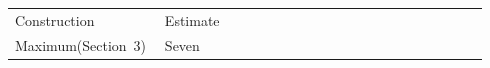 \begin{tabular}{@{}p{0.28\linewidth}p{0.66\linewidth}@{}}Construction & Estimate \\ Maximum\newline (Section~3) & Seven \\ \end{tabular}
